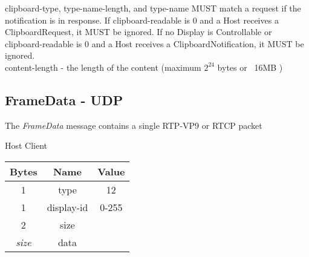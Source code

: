 clipboard-type, type-name-length, and type-name MUST match a request if the notification is in response. If
clipboard-readable is 0 and a Host receives a ClipboardRequest, it MUST be ignored. If no Display is Controllable or
clipboard-readable is 0 and a Host receives a ClipboardNotification, it MUST be ignored.\\

content-length -  the length of the content  (maximum $2^{24}$ bytes or ~16MB )\\

\subsection{FrameData - UDP}

The \emph{FrameData} message contains a single RTP-VP9 or RTCP packet

\begin{center}
    Host \textrightarrow Client\\
    \begin{tabular}{|c|c|c|}
        \hline
        \textbf{Bytes} & \textbf{Name} & \textbf{Value} \\
        \hline
        1              & type          & 12             \\
        \hline
        1              & display-id    & 0-255          \\
        \hline
        2              & size          &                \\
        \hline
        \emph{size}    & data          &                \\
        \hline
    \end{tabular}
\end{center}